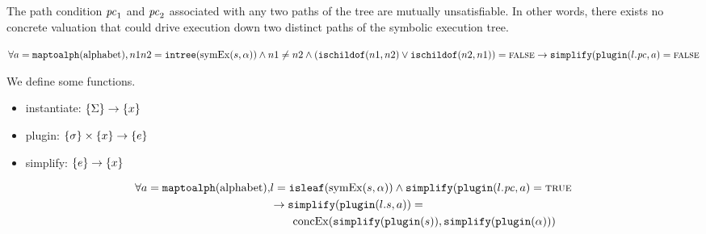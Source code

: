 \begin{property}
  \label{prop:kingunique}
The path condition $\mathit{pc}_1$ and $\mathit{pc}_2$ associated with any two paths of the
tree are mutually unsatisfiable. In other words, there exists no concrete
valuation that could drive execution down two distinct paths of the symbolic
execution tree.

$
\forall a = \mathtt{maptoalph}(\mathrm{alphabet}),  n1 n2 =
\mathtt{intree}(\mathrm{symEx}(s,\alpha))  \wedge
n1 \neq n2
 \wedge
(\mathtt{ischildof}(n1, n2) \vee  \mathtt{ischildof}(n2, n1))= \mathtt{\textsc{false}}
\rightarrow \mathtt{simplify}(\mathtt{plugin}(l.\mathit{pc},a) = \mathtt{\textsc{false}}
$
\end{property}

\begin{property}[Commutativity]
  We define some functions.
  \begin{itemize}
  \item instantiate: $\{\Sigma\} \rightarrow \{x\}$
  \item plugin: $\{\sigma\} \times \{x\} \rightarrow
    \{e\}$
  \item simplify: $\{e\} \rightarrow \{x\}$
  \end{itemize}

\begin{align*}
\forall a = \mathtt{maptoalph}(\mathrm{alphabet}), & l =
\mathtt{isleaf}(\mathrm{symEx}(s,\alpha)) \wedge
\mathtt{simplify}(\mathtt{plugin}(l.\mathit{pc},a) = \mathtt{\textsc{true}} \\
&\rightarrow \mathtt{simplify}(\mathtt{plugin}(l.s,a)) = \\
&\qquad\mathrm{concEx}(\mathtt{simplify}(\mathtt{plugin}(s)),\mathtt{simplify}(\mathtt{plugin}(\alpha)))
\end{align*}
\end{property}

